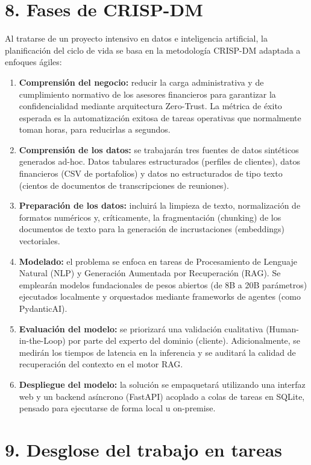 \documentclass[
11pt, %
]{charter}
\begin{document}
\section{8. Fases de CRISP-DM}

Al tratarse de un proyecto intensivo en datos e inteligencia artificial, la planificación del ciclo de vida se basa en la metodología CRISP-DM adaptada a enfoques ágiles:

\begin{enumerate}
  \item \textbf{Comprensión del negocio:} reducir la carga administrativa y de cumplimiento normativo de los asesores financieros para garantizar la confidencialidad mediante arquitectura Zero-Trust. La métrica de éxito esperada es la automatización exitosa de tareas operativas que normalmente toman horas, para reducirlas a segundos.
  \item \textbf{Comprensión de los datos:} se trabajarán tres fuentes de datos sintéticos generados ad-hoc. Datos tabulares estructurados (perfiles de clientes), datos financieros (CSV de portafolios) y datos no estructurados de tipo texto (cientos de documentos de transcripciones de reuniones).
  \item \textbf{Preparación de los datos:} incluirá la limpieza de texto, normalización de formatos numéricos y, críticamente, la fragmentación (chunking) de los documentos de texto para la generación de incrustaciones (embeddings) vectoriales.
  \item \textbf{Modelado:} el problema se enfoca en tareas de Procesamiento de Lenguaje Natural (NLP) y Generación Aumentada por Recuperación (RAG). Se emplearán modelos fundacionales de pesos abiertos (de 8B a 20B parámetros) ejecutados localmente y orquestados mediante frameworks de agentes (como PydanticAI).
  \item \textbf{Evaluación del modelo:} se priorizará una validación cualitativa (Human-in-the-Loop) por parte del experto del dominio (cliente). Adicionalmente, se medirán los tiempos de latencia en la inferencia y se auditará la calidad de recuperación del contexto en el motor RAG.
  \item \textbf{Despliegue del modelo:} la solución se empaquetará utilizando una interfaz web y un backend asíncrono (FastAPI) acoplado a colas de tareas en SQLite, pensado para ejecutarse de forma local u on-premise.
\end{enumerate}

\section{9. Desglose del trabajo en tareas}
\label{sec:wbs}
\end{document}

